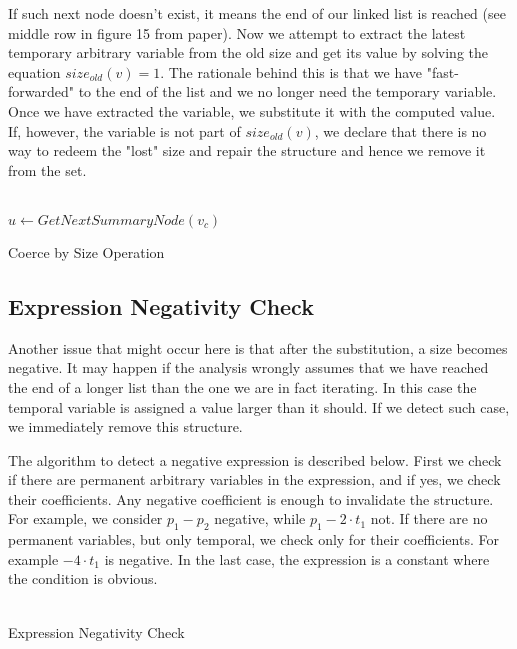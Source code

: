 If such next node doesn't exist, it means the end of our linked list is reached (see middle row in figure 15 from paper). Now we attempt to extract the latest temporary arbitrary variable from the old size and get its value by solving the equation $size_{old}(v)=1$. The rationale behind this is that we have "fast-forwarded" to the end of the list and we no longer need the temporary variable. Once we have extracted the variable, we substitute it with the computed value. If, however, the variable is not part of $size_{old}(v)$, we declare that there is no way to redeem the "lost" size and repair the structure and hence we remove it from the set.
\\ \\
\begin{algorithm}[H]
	\SetAlgoLined
	$u\leftarrow GetNextSummaryNode(v_c)$ \;
	\caption{Coerce by Size Operation\label{IR}}
\end{algorithm}

\subsection*{Expression Negativity Check}
Another issue that might occur here is that after the substitution, a size becomes negative. It may happen if the analysis wrongly assumes that we have reached the end of a longer list than the one we are in fact iterating. In this case the temporal variable is assigned a value larger than it should. If we detect such case, we immediately remove this structure.

The algorithm to detect a negative expression is described below. First we check if there are permanent arbitrary variables in the expression, and if yes, we check their coefficients. Any negative coefficient is enough to invalidate the structure. For example, we consider $p_1-p_2$ negative, while $p_1-2\cdot t_1$ not. If there are no permanent variables, but only temporal, we check only for their coefficients. For example $-4\cdot t_1$ is negative. In the last case, the expression is a constant where the condition is obvious.
\\ \\
\begin{algorithm}[H]
	\SetAlgoLined
	\caption{Expression Negativity Check\label{IR}}
\end{algorithm}

